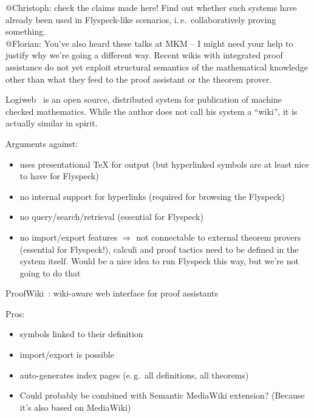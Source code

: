 \documentclass{llncs}
\begin{document}
\begin{todo}{@Christoph: check the claims made here!  Find out whether such systems have
    already been used in Flyspeck-like scenarios, i.\,e.\ collaboratively proving something.\\
    @Florian: You've also heard these talks at MKM -- I might need your help to justify
    why we're going a different way.}  Recent wikis with integrated proof assistance do
  not yet exploit structural semantics of the mathematical knowledge other than what they
  feed to the proof assistant or the theorem prover.

  Logiweb~\cite{Grue:Logiweb07} is an open source, distributed system for publication of
  machine checked mathematics.  While the author does not call his system a ``wiki'', it
  is actually similar in spirit.

  Arguments against:
  \begin{itemize}
  \item uses presentational {\TeX} for output (but hyperlinked symbols are at least nice
    to have for Flyspeck)
  \item no internal support for hyperlinks (required for browsing the Flyspeck)
  \item no query/search/retrieval (essential for Flyspeck)
  \item no import/export features $\Rightarrow$ not connectable to external theorem
    provers (essential for Flyspeck!), calculi and proof tactics need to be defined in the
    system itself.  Would be a nice idea to run Flyspeck this way, but we're not going to
    do that
  \end{itemize}

  ProofWiki~\cite{CorKal:CoopReposFormalProofs07}:
  wiki-aware web interface for proof assistants

  Pros:
  \begin{itemize}
  \item symbols linked to their definition
  \item import/export is possible
  \item auto-generates index pages (e.\,g.\ all definitions, all theorems)
  \item Could probably be combined with Semantic MediaWiki extension?  (Because it's also
    based on MediaWiki)
  \end{itemize}


\end{todo}
\end{document}
